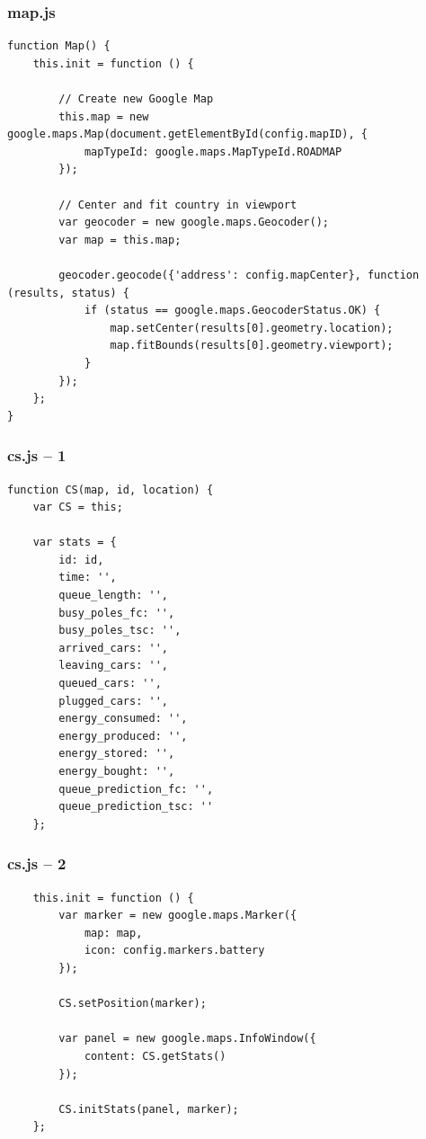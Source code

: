 \begin{frame}[fragile]
\frametitle{map.js}

\begin{verbatim}
function Map() {
    this.init = function () {

        // Create new Google Map
        this.map = new google.maps.Map(document.getElementById(config.mapID), {
            mapTypeId: google.maps.MapTypeId.ROADMAP
        });

        // Center and fit country in viewport
        var geocoder = new google.maps.Geocoder();
        var map = this.map;

        geocoder.geocode({'address': config.mapCenter}, function (results, status) {
            if (status == google.maps.GeocoderStatus.OK) {
                map.setCenter(results[0].geometry.location);
                map.fitBounds(results[0].geometry.viewport);
            }
        });
    };
}
\end{verbatim}

\end{frame}
\clearpage



\begin{frame}[fragile]
\frametitle{cs.js – 1}

\begin{verbatim}
function CS(map, id, location) {
    var CS = this;

    var stats = {
        id: id,
        time: '',
        queue_length: '',
        busy_poles_fc: '',
        busy_poles_tsc: '',
        arrived_cars: '',
        leaving_cars: '',
        queued_cars: '',
        plugged_cars: '',
        energy_consumed: '',
        energy_produced: '',
        energy_stored: '',
        energy_bought: '',
        queue_prediction_fc: '',
        queue_prediction_tsc: ''
    };
\end{verbatim}

\end{frame}
\clearpage



\begin{frame}[fragile]
\frametitle{cs.js – 2}

\begin{verbatim}
    this.init = function () {
        var marker = new google.maps.Marker({
            map: map,
            icon: config.markers.battery
        });

        CS.setPosition(marker);

        var panel = new google.maps.InfoWindow({
            content: CS.getStats()
        });

        CS.initStats(panel, marker);
    };
\end{verbatim}

\end{frame}
\clearpage



